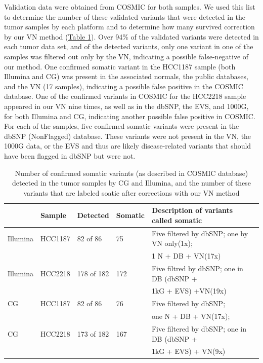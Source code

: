 Validation data were obtained from COSMIC for both samples. We used this list to determine the number of these validated variants that were detected in the tumor samples by each platform and to determine how many survived correction by our VN method (\hyperref[table:table2]{Table \ref{table:table2}}). Over 94\% of the validated variants were detected in each tumor data set, and of the detected variants, only one variant in one of the samples was filtered out only by the VN, indicating a possible false-negative of our method. One confirmed somatic variant in the HCC1187 sample (both Illumina and CG) was present in the associated normals, the public databases, and the VN (17 samples), indicating a possible false positive in the COSMIC database. One of the confirmed variants in COSMIC for the HCC2218 sample appeared in our VN nine times, as well as in the dbSNP, the EVS, and 1000G, for both Illumina and CG, indicating another possible false positive in COSMIC. For each of the samples, five confirmed somatic variants were present in the dbSNP (NonFlagged) database. These variants were not present in the VN, the 1000G data, or the EVS and thus are likely disease-related variants that should have been flagged in dbSNP but were not.

\small
\begin{table}[t!]
\centering
\begin{tabular}{lllll}
          & Sample  & Detected   & Somatic & Description of variants called somatic \\ \hline
Illumina  & HCC1187 & 82 of 86   & 75      & Five filtered by dbSNP; one by VN only(1x); \\
          &         &            &         & 1 N + DB + VN(17x) \\
Illumina  & HCC2218 & 178 of 182 & 172     & Five filtred by dbSNP; one in DB (dbSNP + \\
          &         &            &         & 1kG + EVS) +VN(19x)\\
CG        & HCC1187 & 82 of 86   & 76      & Five filtered by dbSNP;\\
          &         &            &         & one N + DB + VN(17x); \\
CG        & HCC2218 & 173 of 182 & 167     & Five filtered by dbSNP; one in DB (dbSNP + \\
          &         &            &         & 1kG + EVS) + VN(9x) \\
\end{tabular}
\caption{Number of confirmed somatic variants (as described in COSMIC database) detected in the tumor samples by CG and Illumina, and the number of these variants that are labeled soatic after corrections with our VN method}
\label{table:table2}
\end{table}
\normalsize

